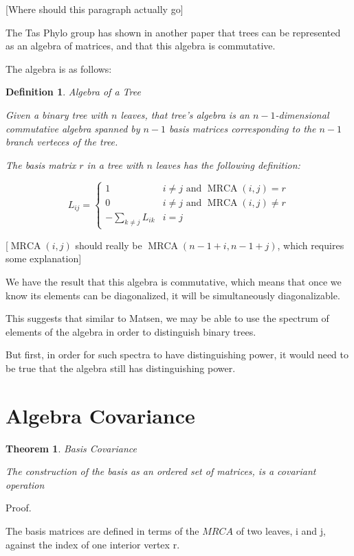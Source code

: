 \documentclass[10pt,a4paper]{report}
\DeclareMathOperator{\MRCA}{MRCA}
\newtheorem{definition}{Definition}
\newtheorem{theorem}{Theorem}
\begin{document}
[Where should this paragraph actually go]

The Tas Phylo group has shown in another paper that trees can be represented as
an algebra of matrices, and that this algebra is commutative.

The algebra is as follows:

\begin{definition} Algebra of a Tree

	Given a binary tree with $n$ leaves, that tree's algebra is an
	$n-1$-dimensional commutative algebra spanned by $n-1$ basis matrices
	corresponding to the $n-1$ branch verteces of the tree.

	The basis matrix $r$ in a tree with $n$ leaves has the following
	definition:
\end{definition}
	\[ L_{ij} = \begin{cases}
		1 & i \neq j \textrm{ and } \MRCA(i, j) = r\\
		0 & i \neq j \textrm{ and } \MRCA(i, j) \neq r\\
		-\sum_{k \neq j} L_{ik} & i = j
	\end{cases} \]

[$\MRCA(i, j)$ should really be $\MRCA(n-1+i, n-1+j)$, which requires some explanation]

We have the result that this algebra is commutative, which means that once we know its elements can be diagonalized, it will be simultaneously diagonalizable.

This suggests that similar to Matsen, we may be able to use the spectrum of elements of the algebra in order to distinguish binary trees.

But first, in order for such spectra to have distinguishing power, it would need to be true that the algebra still has distinguishing power.

\section{Algebra Covariance}

\begin{theorem} Basis Covariance

	The construction of the basis as an ordered set of matrices, is a covariant operation
\end{theorem}

Proof.

The basis matrices are defined in terms of the $MRCA$ of two leaves, i and j, against the index of one interior vertex r.
\end{document}

